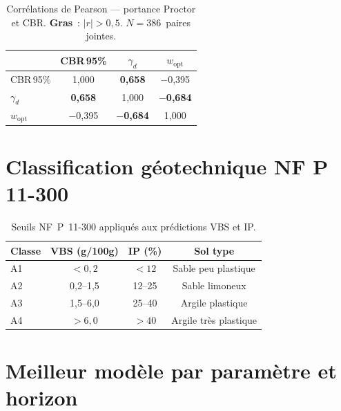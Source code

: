 \documentclass[10pt,a4paper,twocolumn]{article}
\begin{document}
	\begin{table}[H]
		\centering\small
		\caption{Corrélations de Pearson --- portance Proctor et CBR.
			\textbf{Gras}~: $|r|>0{,}5$. $N=386$~paires jointes.}
		\label{tab:corr_portance}
		\begin{tabular}{lccc}
			\toprule
			& CBR\,95\% & $\gamma_d$ & $w_{\mathrm{opt}}$ \\
			\midrule
			CBR\,95\%           & 1,000 & \textbf{0,658}  & $-$0,395 \\
			$\gamma_d$          & \textbf{0,658}  & 1,000 & \textbf{$-$0,684} \\
			$w_{\mathrm{opt}}$  & $-$0,395 & \textbf{$-$0,684} & 1,000 \\
			\bottomrule
		\end{tabular}
	\end{table}
	
	\section{Classification géotechnique NF P 11-300}
	\label{app:classification}
	
	\begin{table}[H]
		\centering\small
		\caption{Seuils NF~P~11-300 appliqués aux prédictions VBS et IP.}
		\label{tab:nfp11300}
		\begin{tabular}{lccc}
			\toprule
			Classe & VBS (g/100g) & IP (\%) & Sol type \\
			\midrule
			A1 & $<0{,}2$    & $<12$    & Sable peu plastique \\
			A2 & 0{,}2--1{,}5 & 12--25  & Sable limoneux      \\
			A3 & 1{,}5--6{,}0 & 25--40  & Argile plastique    \\
			A4 & $>6{,}0$    & $>40$    & Argile très plastique \\
			\bottomrule
		\end{tabular}
	\end{table}
	
	\section{Meilleur modèle par paramètre et horizon}
	\label{app:best_model_ext}
	
\end{document}
